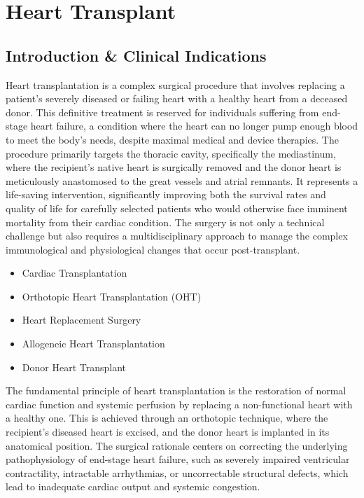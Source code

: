 \chapter{Heart Transplant}

\section*{Introduction \& Clinical Indications}
Heart transplantation is a complex surgical procedure that involves replacing a patient's severely diseased or failing heart with a healthy heart from a deceased donor. This definitive treatment is reserved for individuals suffering from end-stage heart failure, a condition where the heart can no longer pump enough blood to meet the body's needs, despite maximal medical and device therapies. The procedure primarily targets the thoracic cavity, specifically the mediastinum, where the recipient's native heart is surgically removed and the donor heart is meticulously anastomosed to the great vessels and atrial remnants. It represents a life-saving intervention, significantly improving both the survival rates and quality of life for carefully selected patients who would otherwise face imminent mortality from their cardiac condition. The surgery is not only a technical challenge but also requires a multidisciplinary approach to manage the complex immunological and physiological changes that occur post-transplant.

\begin{itemize}
  \item Cardiac Transplantation
  \item Orthotopic Heart Transplantation (OHT)
  \item Heart Replacement Surgery
  \item Allogeneic Heart Transplantation
  \item Donor Heart Transplant
\end{itemize}

The fundamental principle of heart transplantation is the restoration of normal cardiac function and systemic perfusion by replacing a non-functional heart with a healthy one. This is achieved through an orthotopic technique, where the recipient's diseased heart is excised, and the donor heart is implanted in its anatomical position. The surgical rationale centers on correcting the underlying pathophysiology of end-stage heart failure, such as severely impaired ventricular contractility, intractable arrhythmias, or uncorrectable structural defects, which lead to inadequate cardiac output and systemic congestion.

